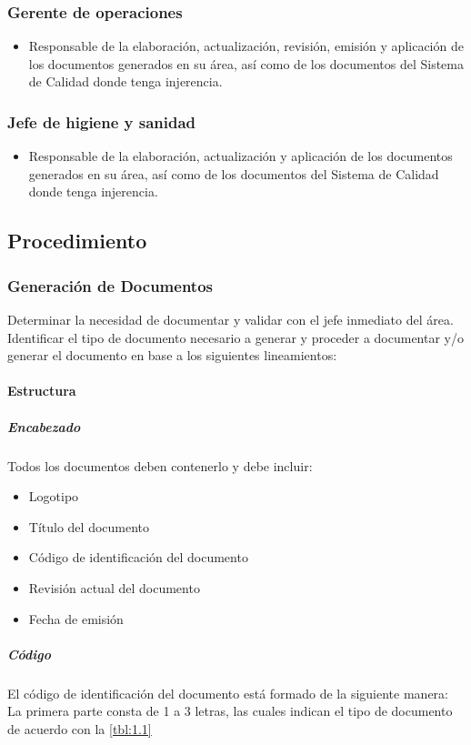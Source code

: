 \subsubsection{Gerente de operaciones}
\begin{itemize}
    \item Responsable de la elaboración, actualización, revisión, emisión y aplicación de los documentos generados en su área, así como de los documentos del Sistema de Calidad donde tenga injerencia.
\end{itemize}

\subsubsection{Jefe de higiene y sanidad}
\begin{itemize}
    \item Responsable de la elaboración, actualización y aplicación de los documentos generados en su área, así como de los documentos del Sistema de Calidad donde tenga injerencia.
\end{itemize}

\subsection{Procedimiento}
\subsubsection{Generación de Documentos} \label{GenDeDoc}
Determinar la necesidad de documentar y validar con el jefe inmediato del área. Identificar el tipo de documento necesario a generar y proceder a documentar y/o generar el documento en base a los siguientes lineamientos:
\paragraph{Estructura}
\subparagraph{Encabezado}
Todos los documentos deben contenerlo y debe incluir:
\begin{itemize}
    \item Logotipo
    \item Título del documento
    \item Código de identificación del documento
    \item Revisión actual del documento
    \item Fecha de emisión
\end{itemize}

\subparagraph{Código}
El código de identificación del documento está formado de la siguiente manera:
La primera parte consta de 1 a 3 letras, las cuales indican el tipo de documento de acuerdo con la \cref{tbl:1.1}

